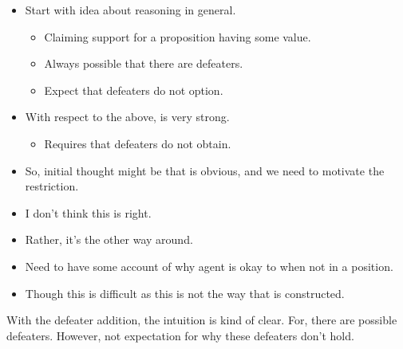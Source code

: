 \begin{note}[Intuition]
  \begin{itemize}
  \item Start with idea about reasoning in general.
    \begin{itemize}
    \item Claiming support for a proposition having some value.
    \item Always possible that there are defeaters.
    \item Expect that defeaters do not option.
    \end{itemize}
  \item With respect to the above, \RBV{} is very strong.
    \begin{itemize}
    \item Requires that defeaters do not obtain.
    \end{itemize}
  \item So, initial thought might be that \RBV{} is obvious, and we need to motivate the restriction.
  \item I don't think this is right.
  \item Rather, it's the other way around.
  \item Need to have some account of why agent is okay to \RBV{} when not in a position.
  \item Though this is difficult as this is not the way that \nI{} is constructed.
  \end{itemize}

  {
    \color{red}
    With the defeater addition, the intuition is kind of clear.
    For, there are possible defeaters.
    However, not expectation for why these defeaters don't hold.
  }
\end{note}

